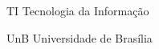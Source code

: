 \begin{siglas}
  \item[TI] Tecnologia da Informação
  \item[UnB] Universidade de Brasília
\end{siglas}
